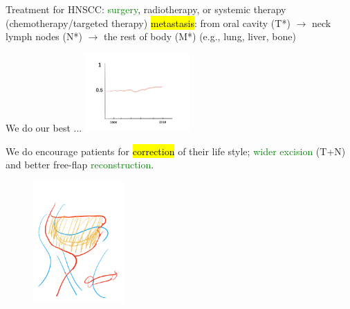\documentclass[
paper=landscape,
paper=160mm:90mm, %
fontsize=11pt, %
pagesize, %
parskip=half-, %
]{scrartcl} %
\theoremstyle{mythmstyle} %
\begin{document}
\begin{outline}
\1  Treatment for HNSCC: \textcolor{green}{surgery}, radiotherapy, or systemic therapy (chemotherapy/targeted therapy)
    \2 \hl{metastasis}: from oral cavity (T*) $\longrightarrow$ neck lymph nodes (N*) $\longrightarrow$ the rest of body (M*) (e.g., lung, liver, bone)
    
\clearpage


\1 We do our best ...
\includegraphics[width=4cm]{stationary_survival_Artwork 2.jpg}

\1 We do
    \2 encourage patients for \hl{correction} of their life style;
    \2 \textcolor{green}{wider excision} (T+N) and better free-flap \textcolor{green}{reconstruction}.
\end{outline}
\begin{figure}
    \centering
\includegraphics[width=3.5cm]{SOHND_Artwork.jpg}
\end{figure}



\clearpage

\thispagestyle{headings}
\end{document}
